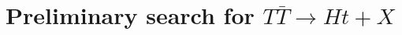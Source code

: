 \clearpage{\pagestyle{empty}\cleardoublepage}

\chapter{Preliminary search for $T\bar{T}\to Ht+X$}\label{chap:htx}
